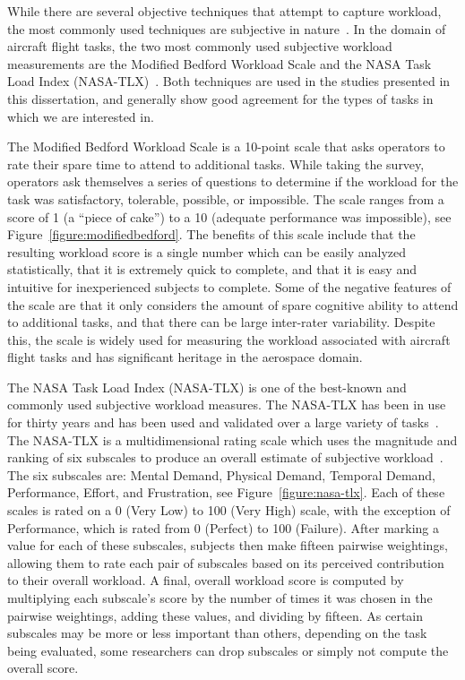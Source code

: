 While there are several objective techniques that attempt to capture workload, the most commonly used techniques are subjective in nature~\citep{hart_development_1988}.
In the domain of aircraft flight tasks, the two most commonly used subjective workload measurements are the Modified Bedford Workload Scale and the NASA Task Load Index (NASA-TLX)~\citep{roscoe_subjective_1990, hart_development_1988, hart_nasa-task_2006}.
Both techniques are used in the studies presented in this dissertation, and generally show good agreement for the types of tasks in which we are interested in.

The Modified Bedford Workload Scale is a 10-point scale that asks operators to rate their spare time to attend to additional tasks.
While taking the survey, operators ask themselves a series of questions to determine if the workload for the task was satisfactory, tolerable, possible, or impossible.
The scale ranges from a score of 1 (a ``piece of cake'') to a 10 (adequate performance was impossible), see Figure~\ref{figure:modifiedbedford}.
The benefits of this scale include that the resulting workload score is a single number which can be easily analyzed statistically, that it is extremely quick to complete, and that it is easy and intuitive for inexperienced subjects to complete.
Some of the negative features of the scale are that it only considers the amount of spare cognitive ability to attend to additional tasks, and that there can be large inter-rater variability.
Despite this, the scale is widely used for measuring the workload associated with aircraft flight tasks and has significant heritage in the aerospace domain.

The NASA Task Load Index (NASA-TLX) is one of the best-known and commonly used subjective workload measures.
The NASA-TLX has been in use for thirty years and has been used and validated over a large variety of tasks~\citep{hart_nasa-task_2006}.
The NASA-TLX is a multidimensional rating scale which uses the magnitude and ranking of six subscales to produce an overall estimate of subjective workload~\citep{hart_development_1988}.
The six subscales are: Mental Demand, Physical Demand, Temporal Demand, Performance, Effort, and Frustration, see Figure~\ref{figure:nasa-tlx}.
Each of these scales is rated on a 0 (Very Low) to 100 (Very High) scale, with the exception of Performance, which is rated from 0 (Perfect) to 100 (Failure).
After marking a value for each of these subscales, subjects then make fifteen pairwise weightings, allowing them to rate each pair of subscales based on its perceived contribution to their overall workload.
A final, overall workload score is computed by multiplying each subscale's score by the number of times it was chosen in the pairwise weightings, adding these values, and dividing by fifteen.
As certain subscales may be more or less important than others, depending on the task being evaluated, some researchers can drop subscales or simply not compute the overall score.

